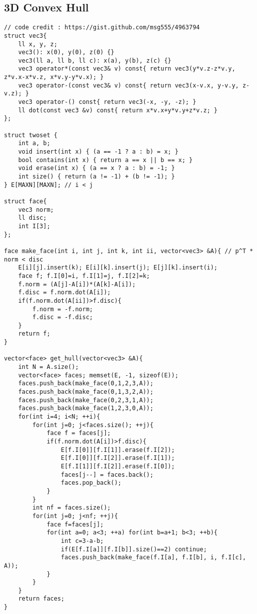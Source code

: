 \documentclass[landscape, 10pt, a4paper, oneside,  twocolumn]{article}
\begin{document}
\subsection{3D Convex Hull}
\begin{verbatim}
// code credit : https://gist.github.com/msg555/4963794
struct vec3{
	ll x, y, z;
	vec3(): x(0), y(0), z(0) {}
	vec3(ll a, ll b, ll c): x(a), y(b), z(c) {}
	vec3 operator*(const vec3& v) const{ return vec3(y*v.z-z*v.y, z*v.x-x*v.z, x*v.y-y*v.x); }
	vec3 operator-(const vec3& v) const{ return vec3(x-v.x, y-v.y, z-v.z); }
	vec3 operator-() const{ return vec3(-x, -y, -z); }
	ll dot(const vec3 &v) const{ return x*v.x+y*v.y+z*v.z; }
};

struct twoset {
	int a, b;
	void insert(int x) { (a == -1 ? a : b) = x; }
	bool contains(int x) { return a == x || b == x; }
	void erase(int x) { (a == x ? a : b) = -1; }
	int size() { return (a != -1) + (b != -1); }
} E[MAXN][MAXN]; // i < j

struct face{ 
	vec3 norm;
	ll disc;
	int I[3];
};

face make_face(int i, int j, int k, int ii, vector<vec3> &A){ // p^T * norm < disc
	E[i][j].insert(k); E[i][k].insert(j); E[j][k].insert(i);
	face f; f.I[0]=i, f.I[1]=j, f.I[2]=k;
	f.norm = (A[j]-A[i])*(A[k]-A[i]);
	f.disc = f.norm.dot(A[i]);
	if(f.norm.dot(A[ii])>f.disc){
		f.norm = -f.norm;
		f.disc = -f.disc;
	}
	return f;
}

vector<face> get_hull(vector<vec3> &A){
	int N = A.size();
	vector<face> faces; memset(E, -1, sizeof(E));
	faces.push_back(make_face(0,1,2,3,A));
	faces.push_back(make_face(0,1,3,2,A));
	faces.push_back(make_face(0,2,3,1,A));
	faces.push_back(make_face(1,2,3,0,A));
	for(int i=4; i<N; ++i){
		for(int j=0; j<faces.size(); ++j){
			face f = faces[j];
			if(f.norm.dot(A[i])>f.disc){
				E[f.I[0]][f.I[1]].erase(f.I[2]);
				E[f.I[0]][f.I[2]].erase(f.I[1]);
				E[f.I[1]][f.I[2]].erase(f.I[0]);
				faces[j--] = faces.back();
				faces.pop_back();
			}
		}
		int nf = faces.size();
		for(int j=0; j<nf; ++j){
			face f=faces[j];
			for(int a=0; a<3; ++a) for(int b=a+1; b<3; ++b){
				int c=3-a-b;
				if(E[f.I[a]][f.I[b]].size()==2) continue;
				faces.push_back(make_face(f.I[a], f.I[b], i, f.I[c], A));
			}
		}
	}
	return faces;
}
\end{verbatim}
\end{document}
